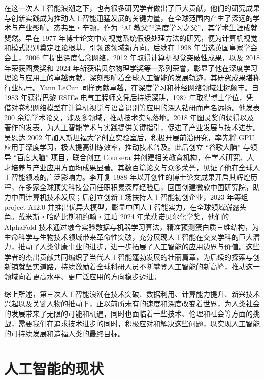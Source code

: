 在这一次人工智能浪潮之下，也有很多研究学者做出了巨大贡献，他们的研究成果与创新实践成为推动人工智能迅猛发展的关键力量，在全球范围内产生了深远的学术与产业影响。杰弗里・辛顿，作为 “AI 教父”“深度学习之父”，其学术生涯成就斐然。早在 1977 年博士论文中对视觉系统假设处理方法的研究，便为计算机视觉和模式识别奠定理论根基，引领该领域新方向。后续在 1998 年当选英国皇家学会会士，2006 年提出深度信念网络，2012 年取得计算机视觉突破性成果，以及 2018 年荣获图灵奖和 2024 年斩获诺贝尔物理学奖等一系列荣誉，彰显了他在深度学习理论与应用上的卓越贡献，深刻影响着全球人工智能的发展轨迹，其研究成果堪称行业标杆。Yann LeCun 同样贡献卓越，在深度学习和神经网络领域建树颇丰。自 1983 年获得巴黎 ESIEe 电气工程师文凭后持续深耕，1987 年取得博士学位，凭借对卷积网络模型在计算机视觉与语音识别等应用的深入钻研而声名远扬。他发表 200 余篇学术论文，涉及多领域，推动技术实际落地。2018 年图灵奖的获得以及著作的发表，为人工智能学术与实践提供关键指引，促进了产业发展与技术进步。吴恩达 2002 年加入斯坦福大学创立实验室后，积极开展前沿研究，率先将 GPU 应用于深度学习，极大提高训练效率，推动技术普及。此后创立 “谷歌大脑” 与领导 “百度大脑” 项目，联合创立 Coursera 并创建相关教育机构，在学术研究、人才培养与产业应用方面均成果显著。其数百篇论文与众多荣誉，见证了他在全球人工智能领域的广泛影响力。李开复 1988 年以开创性的博士论文成果开启其辉煌历程，在多家全球顶尖科技公司任职积累深厚经验后，回国创建微软中国研究院，助力中国计算机技术发展；后创立创新工场扶持人工智能初创企业，2023 年筹组 project AI2.0 并推出优异大模型，彰显中国人工智能实力，在全球领域崭露头角。戴米斯・哈萨比斯和约翰・江珀 2024 年荣获诺贝尔化学奖，他们的 AlphaFold 技术通过融合实验数据与机器学习算法，精准预测蛋白质三维结构，为生命科学与生物技术领域带来革命性突破，充分展现人工智能在交叉学科的巨大潜力，推动了人类健康事业的进步，进一步拓展了人工智能的应用边界与价值。这些学者的杰出贡献共同编织了当代人工智能蓬勃发展的壮丽篇章，为后续的探索与创新铺就坚实道路，持续激励着全球科研人员不断攀登人工智能的新高峰，推动这一领域向着更高水平、更广泛应用的方向稳步迈进。


综上所述，第三次人工智能浪潮在技术突破、数据利用、计算能力提升、新兴技术兴起以及关键人物的推动下，正以前所未有的速度和深度改变着世界，为人类社会的发展带来了无限的可能和机遇，同时也面临着一些技术、伦理和社会等方面的挑战，需要我们在追求技术进步的同时，积极应对和解决这些问题，以实现人工智能的可持续发展和造福人类的最终目标。


\section{人工智能的现状}


